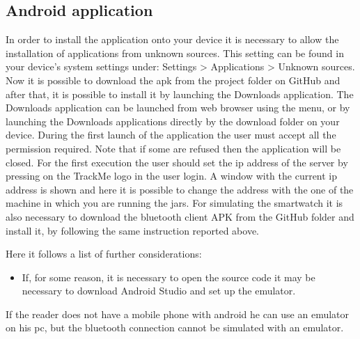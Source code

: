 \subsection{Android application}
In order to install the application onto your device it is necessary to allow the installation of applications from unknown sources. This setting can be found in your device's system settings under: Settings > Applications > Unknown sources. 
\\
Now it is possible to download the apk from the project folder on GitHub and after that, it is possible to install it by launching the Downloads application. The Downloads application can be launched from web browser using the menu, or by launching the 
Downloads applications directly by the download folder on your device. During the first launch of the application the user must 
accept all the permission required. Note that if some are refused then the application will be closed. For the first execution the 
user should set the ip address of the server by pressing on the TrackMe logo in the user login. A window with the current ip 
address is shown and here it is possible to change the address with the one of the machine in which you are running the jars. 
For simulating the smartwatch it is also necessary to download the bluetooth client APK from the GitHub folder and install it, by following the same instruction reported above.

\par 
Here it follows a list of further considerations: 
\begin{itemize}
\item If, for some reason, it is necessary to open the source code it may be necessary to download Android Studio and set up the emulator. \\
\end{itemize}

\par
If the reader does not have a mobile phone with android he can use an emulator on his pc, but the bluetooth connection cannot be simulated with an emulator.

